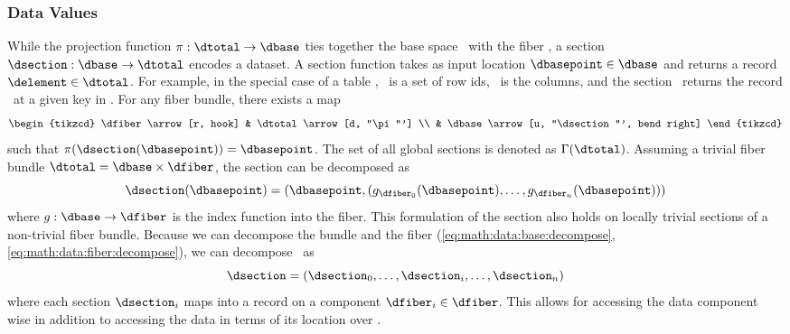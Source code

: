 \documentclass[../main.tex]{subfiles}
\begin{document}
\subsubsection{Data Values}
\label{sec:math:data:section}
While the projection function \(\pi:\dtotal \rightarrow\dbase\) ties together the base space \dbase\ with the fiber \dfiber, a section \(\dsection: \dbase\rightarrow \dtotal\) encodes a dataset. A section function takes as input location \(\dbasepoint \in \dbase\) and returns a record \(\delement \in \dtotal\). For example, in the special case of a table \cite{spivakSIMPLICIALDATABASES}, \dbase\ is a set of row ids, \dfiber\ is the columns, and the section \dsection\ returns the record \delement\ at a given key in \dbase. For any fiber bundle, there exists a map
\begin{equation}
    \begin{tikzcd}
        \dfiber \arrow[r, hook] & \dtotal \arrow[d, "\pi"'] \\
                          & \dbase \arrow[u, "\dsection"', bend right]
    \end{tikzcd}
\end{equation}
 such that \(\pi(\dsection(\dbasepoint)) = \dbasepoint\). The set of all global sections is denoted as \(\Gamma(\dtotal)\). Assuming a trivial fiber bundle \(\dtotal = \dbase \times \dfiber\), the section can be decomposed as 
\begin{equation}
    \label{eq:section_return}
    \dsection(\dbasepoint) = (\dbasepoint, (g_{\dfiber_{0}}(\dbasepoint), \ldots, g_{\dfiber_{n}}(\dbasepoint)))
\end{equation}
where \(g: \dbase \rightarrow \dfiber\) is the index function into the fiber. This formulation of the section also holds on locally trivial sections of a non-trivial fiber bundle. Because we can decompose the bundle and the fiber (\autoref{eq:math:data:base:decompose}, \autoref{eq:math:data:fiber:decompose}), we can decompose \dsection\ as 
\begin{equation}
\label{eq:math:data:section:decompose}
\dsection= (\dsection_0,\ldots, \dsection_i, \dots, \dsection_n) 
\end{equation}
where each section \(\dsection_i\) maps into a record on a component \(\dfiber_i \in \dfiber\). This allows for accessing the data component wise in addition to accessing the data in terms of its location over \dbase.
\end{document}

